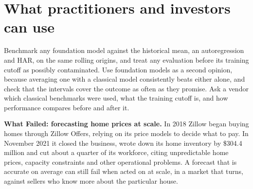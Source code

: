 \section{What practitioners and investors can use}
\label{sec:21-investors}

Benchmark any foundation model against the historical mean, an autoregression and HAR, on the same rolling origins, and treat any evaluation before its training cutoff as possibly contaminated. Use foundation models as a second opinion, because averaging one with a classical model consistently beats either alone, and check that the intervals cover the outcome as often as they promise. Ask a vendor which classical benchmarks were used, what the training cutoff is, and how performance compares before and after it.

\begin{callout}
\textbf{What Failed: forecasting home prices at scale.} In 2018 Zillow began buying homes through Zillow Offers, relying on its price models to decide what to pay. In November 2021 it closed the business, wrote down its home inventory by \$304.4 million and cut about a quarter of its workforce, citing unpredictable home prices, capacity constraints and other operational problems. A forecast that is accurate on average can still fail when acted on at scale, in a market that turns, against sellers who know more about the particular house.
\end{callout}

\makeatletter
{}
\makeatother

